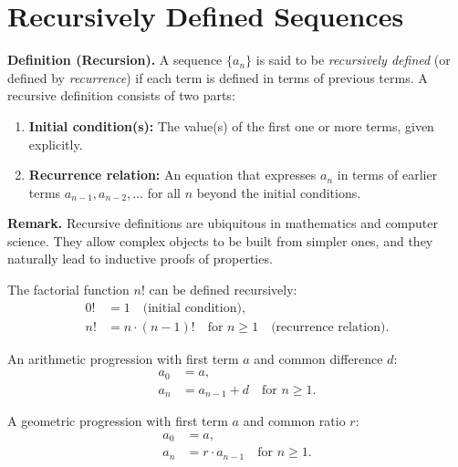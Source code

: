 \documentclass[11pt,a4paper]{article}
\begin{document}
\section{Recursively Defined Sequences}

\textbf{Definition (Recursion).} A sequence $\{a_n\}$ is said to be \textit{recursively defined} (or defined by \textit{recurrence}) if each term is defined in terms of previous terms. A recursive definition consists of two parts:
\begin{enumerate}[label=(\roman*)]
    \item \textbf{Initial condition(s):} The value(s) of the first one or more terms, given explicitly.
    \item \textbf{Recurrence relation:} An equation that expresses $a_n$ in terms of earlier terms $a_{n-1}, a_{n-2}, \dots$ for all $n$ beyond the initial conditions.
\end{enumerate}

\textbf{Remark.} Recursive definitions are ubiquitous in mathematics and computer science. They allow complex objects to be built from simpler ones, and they naturally lead to inductive proofs of properties.

\begin{example}[Factorial]
The factorial function $n!$ can be defined recursively:
\begin{align*}
    0! &= 1 \quad \text{(initial condition)}, \\
    n! &= n \cdot (n-1)! \quad \text{for } n \geq 1 \quad \text{(recurrence relation)}.
\end{align*}
\end{example}

\begin{example}
An arithmetic progression with first term $a$ and common difference $d$:
\begin{align*}
    a_0 &= a, \\
    a_n &= a_{n-1} + d \quad \text{for } n \geq 1.
\end{align*}
\end{example}

\begin{example}
A geometric progression with first term $a$ and common ratio $r$:
\begin{align*}
    a_0 &= a, \\
    a_n &= r \cdot a_{n-1} \quad \text{for } n \geq 1.
\end{align*}
\end{example}
\end{document}
